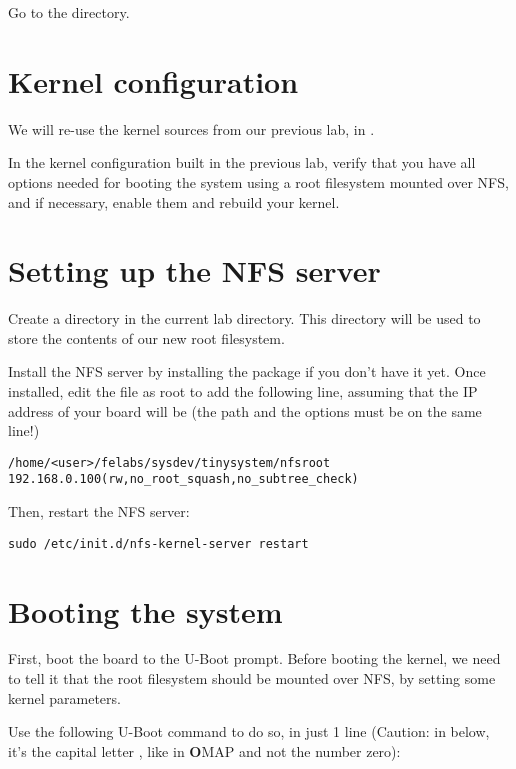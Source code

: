 Go to the  directory.

\section{Kernel configuration}

We will re-use the kernel sources from our previous lab, in
.

In the kernel configuration built in the previous lab, verify that you
have all options needed for booting the system using a root filesystem
mounted over NFS, and if necessary, enable them and rebuild your
kernel.

\section{Setting up the NFS server}

Create a  directory in the current lab directory. This
 directory will be used to store the contents of our new
root filesystem.

Install the NFS server by installing the 
package if you don't have it yet. Once installed, edit the
 file as root to add the following line, assuming that the
IP address of your board will be  (the path and the
options must be on the same line!)

\footnotesize
\begin{verbatim}
/home/<user>/felabs/sysdev/tinysystem/nfsroot 192.168.0.100(rw,no_root_squash,no_subtree_check)
\end{verbatim}
\normalsize

Then, restart the NFS server:

\begin{verbatim}
sudo /etc/init.d/nfs-kernel-server restart
\end{verbatim}

\section{Booting the system}

First, boot the board to the U-Boot prompt. Before booting the kernel,
we need to tell it that the root filesystem should be mounted over
NFS, by setting some kernel parameters.

Use the following U-Boot command to do so, in just 1 line
(Caution: in  below, it's the capital letter , like in
{\bf O}MAP and not the number zero):

